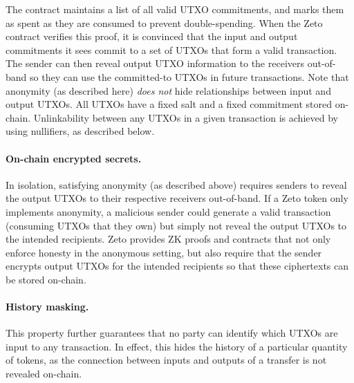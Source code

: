 The contract maintains a list of all valid UTXO commitments, and marks them as spent as they are consumed to prevent double-spending. When the Zeto contract verifies this proof, it is convinced that the input and output commitments it sees commit to a set of UTXOs that form a valid transaction. The sender can then reveal output UTXO information to the receivers out-of-band so they can use the committed-to UTXOs in future transactions. Note that anonymity (as described here) \textit{does not} hide relationships between input and output UTXOs. All UTXOs have a fixed salt and a fixed commitment stored on-chain. Unlinkability between any UTXOs in a given transaction is achieved by using nullifiers, as described below.


\paragraph{On-chain encrypted secrets.} In isolation, satisfying anonymity (as described above) requires senders to reveal the output UTXOs to their respective receivers out-of-band. If a Zeto token only implements anonymity, a malicious sender could generate a valid transaction (consuming UTXOs that they own) but simply not reveal the output UTXOs to the intended recipients. Zeto provides ZK proofs and contracts that not only enforce honesty in the anonymous setting, but also require that the sender encrypts output UTXOs for the intended recipients so that these ciphertexts can be stored on-chain.


\paragraph{History masking.} This property further guarantees that no party can identify which UTXOs are input to any transaction. In effect, this hides the history of a particular quantity of tokens, as the connection between inputs and outputs of a transfer is not revealed on-chain.

